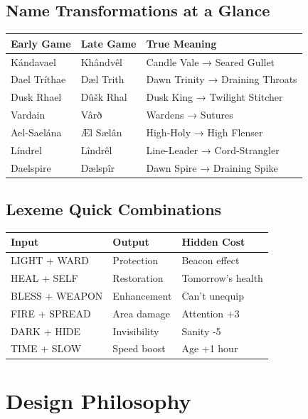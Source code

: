 \documentclass[11pt,a4paper,twoside]{book}
\begin{document}
\section{Name Transformations at a Glance}

\begin{center}
\small
\begin{tabular}{|l|l|l|}
\hline
\textbf{Early Game} & \textbf{Late Game} & \textbf{True Meaning} \\
\hline
Kándavael & Khândvêl & Candle Vale → Seared Gullet \\
Dael Tríthae & Dæl Trith & Dawn Trinity → Draining Throats \\
Dusk Rhael & Dûšk Rhal & Dusk King → Twilight Stitcher \\
Vardain & Vârð & Wardens → Sutures \\
Ael-Saelána & Æl Sælân & High-Holy → High Flenser \\
Líndrel & Lîndrêl & Line-Leader → Cord-Strangler \\
Daelspire & Dælspîr & Dawn Spire → Draining Spike \\
\hline
\end{tabular}
\end{center}

\section{Lexeme Quick Combinations}

\begin{center}
\begin{tabular}{|l|l|l|}
\hline
\textbf{Input} & \textbf{Output} & \textbf{Hidden Cost} \\
\hline
LIGHT + WARD & Protection & Beacon effect \\
HEAL + SELF & Restoration & Tomorrow's health \\
BLESS + WEAPON & Enhancement & Can't unequip \\
FIRE + SPREAD & Area damage & Attention +3 \\
DARK + HIDE & Invisibility & Sanity -5 \\
TIME + SLOW & Speed boost & Age +1 hour \\
\hline
\end{tabular}
\end{center}

\chapter{Design Philosophy}
\end{document}
